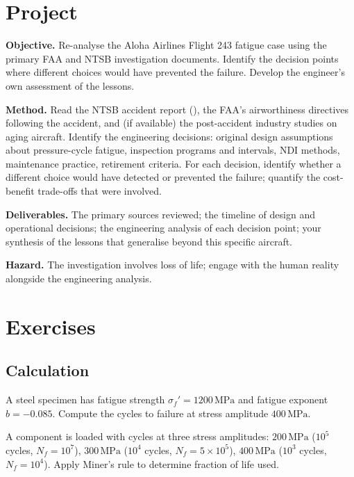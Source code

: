 \section{Project}

\begin{project}
\textbf{Objective.} Re-analyse the Aloha Airlines Flight 243 fatigue case using the primary FAA and NTSB investigation documents. Identify the decision points where different choices would have prevented the failure. Develop the engineer's own assessment of the lessons.

\textbf{Method.} Read the NTSB accident report (\cite{acc:ntsb-aar94-04}), the FAA's airworthiness directives following the accident, and (if available) the post-accident industry studies on aging aircraft. Identify the engineering decisions: original design assumptions about pressure-cycle fatigue, inspection programs and intervals, NDI methods, maintenance practice, retirement criteria. For each decision, identify whether a different choice would have detected or prevented the failure; quantify the cost-benefit trade-offs that were involved.

\textbf{Deliverables.} The primary sources reviewed; the timeline of design and operational decisions; the engineering analysis of each decision point; your synthesis of the lessons that generalise beyond this specific aircraft.

\textbf{Hazard.} The investigation involves loss of life; engage with the human reality alongside the engineering analysis.
\end{project}

\section{Exercises}

\subsection*{Calculation}

\begin{exercise}
A steel specimen has fatigue strength $\sigma_f' = 1200\,\text{MPa}$ and fatigue exponent $b = -0.085$. Compute the cycles to failure at stress amplitude $400\,\text{MPa}$.
\end{exercise}

\begin{exercise}
A component is loaded with cycles at three stress amplitudes: $200\,\text{MPa}$ ($10^5$ cycles, $N_f = 10^7$), $300\,\text{MPa}$ ($10^4$ cycles, $N_f = 5 \times 10^5$), $400\,\text{MPa}$ ($10^3$ cycles, $N_f = 10^4$). Apply Miner's rule to determine fraction of life used.
\end{exercise}

